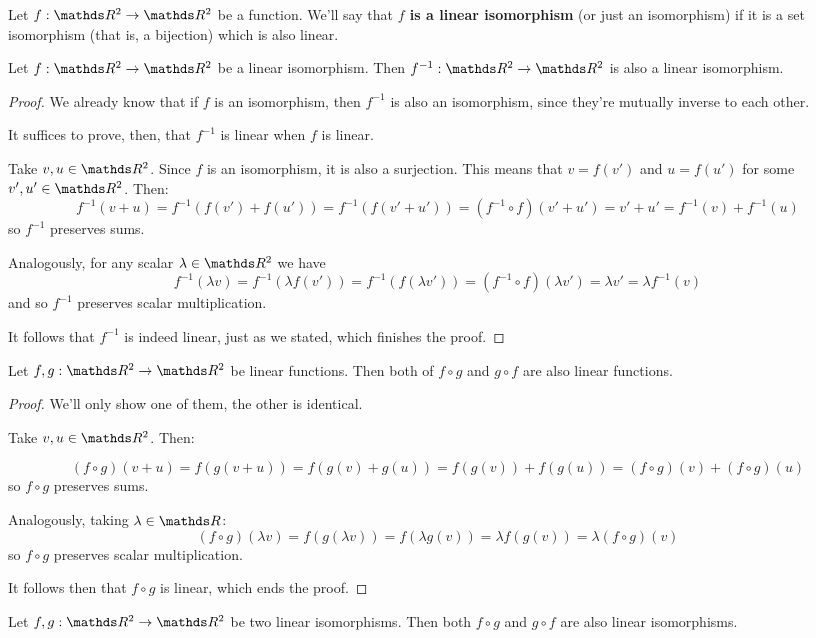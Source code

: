 \begin{df}
	Let $f:\R^2\to\R^2$ be a function. We'll say that \textbf{$f$ is a linear isomorphism} (or just an isomorphism) if it is a set isomorphism (that is, a bijection) which is also linear.
\end{df}
\begin{lemma}
	Let $f:\R^2\to\R^2$ be a linear isomorphism. Then $f^{-1}:\R^2\to\R^2$ is also a linear isomorphism.
\end{lemma}
\begin{proof}
	We already know that if $f$ is an isomorphism, then $f^{-1}$ is also an isomorphism, since they're mutually inverse to each other.
	
	It suffices to prove, then, that $f^{-1}$ is linear when $f$ is linear.
	
	Take $v,u\in \R^2$. Since $f$ is an isomorphism, it is also a surjection. This means that $v=f(v')$ and $u=f(u')$ for some $v',u'\in\R^2$. Then:
	\[f^{-1}(v+u)=f^{-1}(f(v')+f(u'))=f^{-1}(f(v'+u'))=(f^{-1}\circ f)(v'+u')=v'+u'=f^{-1}(v)+f^{-1}(u)\]so $f^{-1}$ preserves sums.
	
	Analogously, for any scalar $\lambda \in\R^2$ we have
	\[f^{-1}(\lambda v)=f^{-1}(\lambda f(v'))=f^{-1}(f(\lambda v'))=(f^{-1}\circ f)(\lambda v')=\lambda v'=\lambda f^{-1}(v)\]and so $f^{-1}$ preserves scalar multiplication.
	
	It follows that $f^{-1}$ is indeed linear, just as we stated, which finishes the proof.
\end{proof}

\begin{prop}
	Let $f,g:\R^2\to\R^2$ be linear functions. Then both of $f\circ g$ and $g\circ f$ are also linear functions.
\end{prop}
\begin{proof}
	We'll only show one of them, the other is identical.
	
	Take $v,u\in\R^2$. Then:
	
	\[(f\circ g)(v+u)=f(g(v+u))=f(g(v)+g(u))=f(g(v))+f(g(u))=(f\circ g)(v)+(f\circ g)(u)\]so $f\circ g$ preserves sums.
	
	Analogously, taking $\lambda\in \R$:
	\[(f\circ g)(\lambda v)=f(g(\lambda v))=f(\lambda g(v))=\lambda f(g(v))=\lambda(f\circ g)(v)\]so $f\circ g$ preserves scalar multiplication.
	
	It follows then that $f\circ g$ is linear, which ends the proof.
\end{proof}
\begin{cor}
	Let $f,g:\R^2\to\R^2$ be two linear isomorphisms. Then both $f\circ g$ and $g\circ f$ are also linear isomorphisms.
\end{cor}

